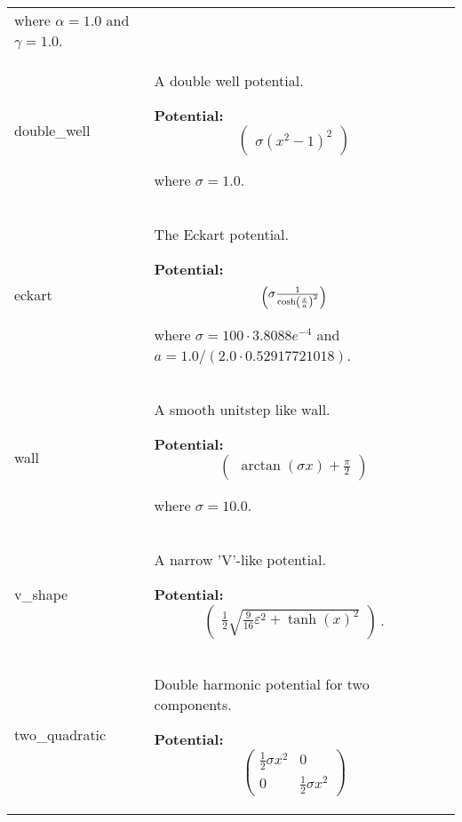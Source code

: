 \begin{longtable}{|p{\varnamewidth}|p{\vardescrwidth}|l}
where $\alpha = 1.0$ and $\gamma = 1.0$.
&\\
\cline{1-2}
\raggedright d\-o\-u\-b\-l\-e\-\_\-w\-e\-l\-l\- & \raggedright A double well potential.

\textbf{Potential:}
\begin{equation}
  \begin{pmatrix}
    \sigma (x^2-1)^2
  \end{pmatrix}
\end{equation}

where $\sigma = 1.0$.
&\\
\cline{1-2}
\raggedright e\-c\-k\-a\-r\-t\- & \raggedright The Eckart potential.

\textbf{Potential:}
\begin{equation}
  \begin{pmatrix}
    \sigma \frac{1}{\cosh\left( \frac{x}{a} \right)^2}
  \end{pmatrix}
\end{equation}

where $\sigma = 100 \cdot 3.8088e^{-4}$ and $a = 1.0 / (2.0 \cdot 0.52917721018)$.
&\\


\cline{1-2}
\raggedright w\-a\-l\-l\- & \raggedright A smooth unitstep like wall.

\textbf{Potential:}
\begin{equation}
  \begin{pmatrix}
    \arctan(\sigma x) + \frac{\pi}{2}
  \end{pmatrix}
\end{equation}

where $\sigma = 10.0$.
&\\
\cline{1-2}
\raggedright v\-\_\-s\-h\-a\-p\-e\- & \raggedright A narrow 'V'-like potential.

\textbf{Potential:}
\begin{equation}
  \begin{pmatrix}
    \frac{1}{2} \sqrt{\frac{9}{16} \varepsilon^2 + \tanh(x)^2}
  \end{pmatrix} \,.
\end{equation}
&\\
\cline{1-2}
\raggedright t\-w\-o\-\_\-q\-u\-a\-d\-r\-a\-t\-i\-c\- & \raggedright Double harmonic potential for two components.

\textbf{Potential:}
\begin{equation}
  \begin{pmatrix}
    \frac{1}{2} \sigma x^2 & 0 \\
    0                      & \frac{1}{2} \sigma x^2
  \end{pmatrix}
\end{equation}


\end{longtable}
